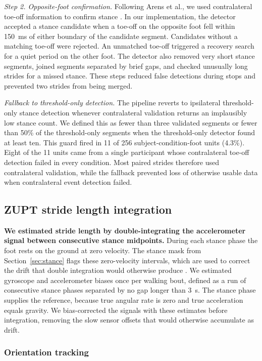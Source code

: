 \documentclass[fleqn,10pt,lineno]{wlpeerj}
\begin{document}
\textit{Step 2. Opposite-foot confirmation.} Following Arens et al., we used contralateral toe-off information to confirm stance \citep{Arens2021}. In our implementation, the detector accepted a stance candidate when a toe-off on the opposite foot fell within 150~ms of either boundary of the candidate segment. Candidates without a matching toe-off were rejected. An unmatched toe-off triggered a recovery search for a quiet period on the other foot. The detector also removed very short stance segments, joined segments separated by brief gaps, and checked unusually long strides for a missed stance. These steps reduced false detections during stops and prevented two strides from being merged.

\textit{Fallback to threshold-only detection.} The pipeline reverts to ipsilateral threshold-only stance detection whenever contralateral validation returns an implausibly low stance count. We defined this as fewer than three validated segments or fewer than 50\% of the threshold-only segments when the threshold-only detector found at least ten. This guard fired in 11 of 256 subject-condition-foot units (4.3\%). Eight of the 11 units came from a single participant whose contralateral toe-off detection failed in every condition. Most paired strides therefore used contralateral validation, while the fallback prevented loss of otherwise usable data when contralateral event detection failed.

\subsection{ZUPT stride length integration}

\textbf{We estimated stride length by double-integrating the accelerometer signal between consecutive stance midpoints.} During each stance phase the foot rests on the ground at zero velocity. The stance mask from Section~\ref{sec:stance} flags these zero-velocity intervals, which are used to correct the drift that double integration would otherwise produce \citep{Foxlin2005, Skog2010}. We estimated gyroscope and accelerometer biases once per walking bout, defined as a run of consecutive stance phases separated by no gap longer than 3~s. The stance phase supplies the reference, because true angular rate is zero and true acceleration equals gravity. We bias-corrected the signals with these estimates before integration, removing the slow sensor offsets that would otherwise accumulate as drift.

\subsubsection{Orientation tracking}
\end{document}
